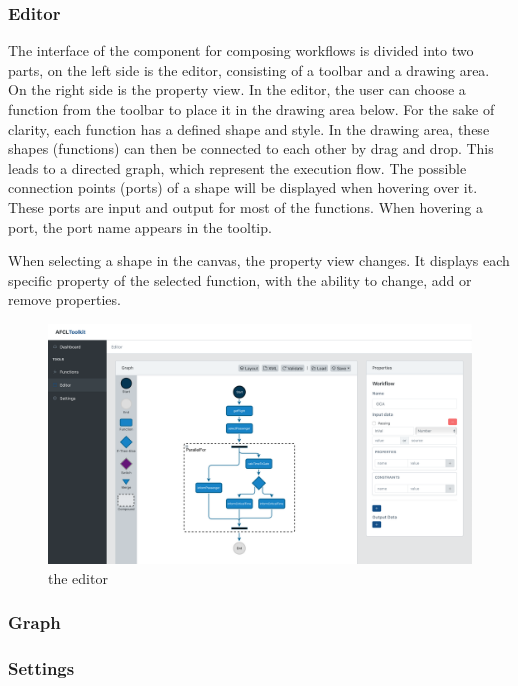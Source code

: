 \documentclass[a4paper,11pt,pdftex,halfparskip,cleardoubleempty]{scrbook}
\begin{document}
\subsubsection{Editor}
\par
The interface of the component for composing workflows is divided into two parts, on the left side is the editor, consisting of a toolbar and a drawing area. On the right side is the property view. In the editor, the user can choose a function from the toolbar to place it in the drawing area below.  For the sake of clarity, each function has a defined shape and style. In the drawing area, these shapes (functions) can then be connected to each other by drag and drop. This leads to a directed graph, which represent the execution flow. The possible connection points (ports) of a shape will be displayed when hovering over it. These ports are input and output for most of the functions. When hovering a port, the port name appears in the tooltip.
\par
When selecting a shape in the canvas, the property view changes. It displays each specific property of the selected function, with the ability to change, add or remove properties.

\begin{figure}[ht]
  \centering
  \includegraphics[width=\textwidth]{editor}
  \caption{the editor}
\end{figure}

\subsubsection{Graph}


\subsubsection{Settings}
\end{document}
